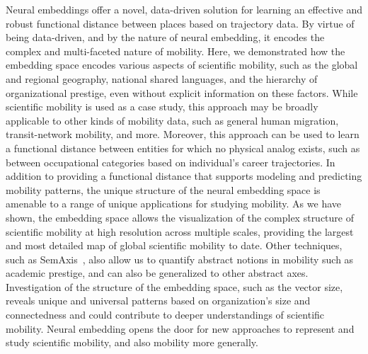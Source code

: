 \documentclass[12pt]{article} %
\begin{document}
Neural embeddings offer a novel, data-driven solution for learning an effective and robust functional distance between places based on trajectory data.
By virtue of being data-driven, and by the nature of neural embedding, it encodes the complex and multi-faceted nature of mobility.
Here, we demonstrated how the embedding space encodes various aspects of scientific mobility, such as the global and regional geography, national shared languages, and the hierarchy of organizational prestige, even without explicit information on these factors.
While scientific mobility is used as a case study, this approach may be broadly applicable to other kinds of mobility data, such as general human migration, transit-network mobility, and more.
Moreover, this approach can be used to learn a functional distance between entities for which no physical analog exists, such as between occupational categories based on individual's career trajectories.
In addition to providing a functional distance that supports modeling and predicting mobility patterns, the unique structure of the neural embedding space is amenable to a range of unique applications for studying mobility.
As we have shown, the embedding space allows the visualization of the complex structure of scientific mobility at high resolution across multiple scales, providing the largest and most detailed map of global scientific mobility to date.
Other techniques, such as SemAxis~\autocite{an2018semaxis}, also allow us to quantify abstract notions in mobility such as academic prestige, and can also be generalized to other abstract axes.
Investigation of the structure of the embedding space, such as the vector size, reveals unique and universal patterns based on organization's size and connectedness and could contribute to deeper understandings of scientific mobility.
Neural embedding opens the door for new approaches to represent and study scientific mobility, and also mobility more generally.
\end{document}
